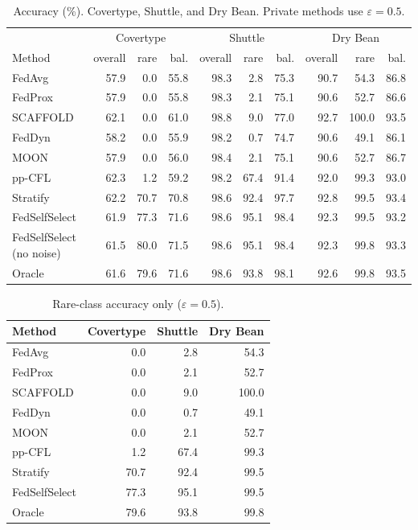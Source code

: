 \documentclass[11pt,a4paper]{article}
\theoremstyle{plain}
\begin{document}
\begin{table}[h]
\centering
\setlength{\tabcolsep}{3.6pt}
\caption{Accuracy (\%). Covertype, Shuttle, and Dry Bean. Private methods use $\varepsilon=0.5$.}
{\small
\begin{tabular}{lrrr rrr rrr}
\toprule
& \multicolumn{3}{c}{Covertype} & \multicolumn{3}{c}{Shuttle} & \multicolumn{3}{c}{Dry Bean} \\
\cmidrule(lr){2-4} \cmidrule(lr){5-7} \cmidrule(lr){8-10}
Method & overall & rare & bal. & overall & rare & bal. & overall & rare & bal. \\
\midrule
FedAvg & 57.9 & 0.0 & 55.8 & 98.3 & 2.8 & 75.3 & 90.7 & 54.3 & 86.8 \\
FedProx & 57.9 & 0.0 & 55.8 & 98.3 & 2.1 & 75.1 & 90.6 & 52.7 & 86.6 \\
SCAFFOLD & 62.1 & 0.0 & 61.0 & 98.8 & 9.0 & 77.0 & 92.7 & 100.0 & 93.5 \\
FedDyn & 58.2 & 0.0 & 55.9 & 98.2 & 0.7 & 74.7 & 90.6 & 49.1 & 86.1 \\
MOON & 57.9 & 0.0 & 56.0 & 98.4 & 2.1 & 75.1 & 90.6 & 52.7 & 86.7 \\
pp-CFL & 62.3 & 1.2 & 59.2 & 98.2 & 67.4 & 91.4 & 92.0 & 99.3 & 93.0 \\
Stratify & 62.2 & 70.7 & 70.8 & 98.6 & 92.4 & 97.7 & 92.8 & 99.5 & 93.4 \\
FedSelfSelect & 61.9 & 77.3 & 71.6 & 98.6 & 95.1 & 98.4 & 92.3 & 99.5 & 93.2 \\
FedSelfSelect (no noise) & 61.5 & 80.0 & 71.5 & 98.6 & 95.1 & 98.4 & 92.3 & 99.8 & 93.3 \\
Oracle & 61.6 & 79.6 & 71.6 & 98.6 & 93.8 & 98.1 & 92.6 & 99.8 & 93.5 \\
\bottomrule
\end{tabular}}
\end{table}

\begin{table}[h]
\centering
\caption{Rare-class accuracy only ($\varepsilon=0.5$).}
\begin{tabular}{Lrrr}
\toprule
Method & Covertype & Shuttle & Dry Bean \\
\midrule
FedAvg & 0.0 & 2.8 & 54.3 \\
FedProx & 0.0 & 2.1 & 52.7 \\
SCAFFOLD & 0.0 & 9.0 & 100.0 \\
FedDyn & 0.0 & 0.7 & 49.1 \\
MOON & 0.0 & 2.1 & 52.7 \\
pp-CFL & 1.2 & 67.4 & 99.3 \\
Stratify & 70.7 & 92.4 & 99.5 \\
FedSelfSelect & 77.3 & 95.1 & 99.5 \\
Oracle & 79.6 & 93.8 & 99.8 \\
\bottomrule
\end{tabular}
\end{table}
\end{document}
